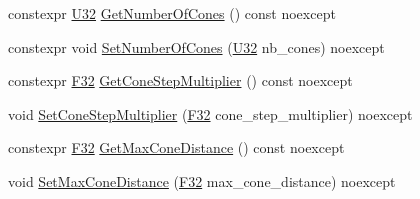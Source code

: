 \begin{DoxyCompactItemize}
\item 
constexpr \hyperlink{namespacemage_a41c104c036fba3756a74e19f793eeaa1}{U32} \hyperlink{classmage_1_1rendering_1_1_voxelization_settings_a3a3c22e03dd55757c99df3f1c22f20bf}{Get\+Number\+Of\+Cones} () const noexcept
\item 
constexpr void \hyperlink{classmage_1_1rendering_1_1_voxelization_settings_ac7b2ca30bb73b5fb7e0c2cc46001ae22}{Set\+Number\+Of\+Cones} (\hyperlink{namespacemage_a41c104c036fba3756a74e19f793eeaa1}{U32} nb\+\_\+cones) noexcept
\item 
constexpr \hyperlink{namespacemage_aa97e833b45f06d60a0a9c4fc22ae02c0}{F32} \hyperlink{classmage_1_1rendering_1_1_voxelization_settings_a672f561214738cbb64252b332e717693}{Get\+Cone\+Step\+Multiplier} () const noexcept
\item 
void \hyperlink{classmage_1_1rendering_1_1_voxelization_settings_a9eafb3795d3e8248196dd7e9c6d32671}{Set\+Cone\+Step\+Multiplier} (\hyperlink{namespacemage_aa97e833b45f06d60a0a9c4fc22ae02c0}{F32} cone\+\_\+step\+\_\+multiplier) noexcept
\item 
constexpr \hyperlink{namespacemage_aa97e833b45f06d60a0a9c4fc22ae02c0}{F32} \hyperlink{classmage_1_1rendering_1_1_voxelization_settings_aa79b36e2c7ef50513548512f2cedfb6b}{Get\+Max\+Cone\+Distance} () const noexcept
\item 
void \hyperlink{classmage_1_1rendering_1_1_voxelization_settings_a137c4c2186b5034f546d0b876cd0633e}{Set\+Max\+Cone\+Distance} (\hyperlink{namespacemage_aa97e833b45f06d60a0a9c4fc22ae02c0}{F32} max\+\_\+cone\+\_\+distance) noexcept
\end{DoxyCompactItemize}
